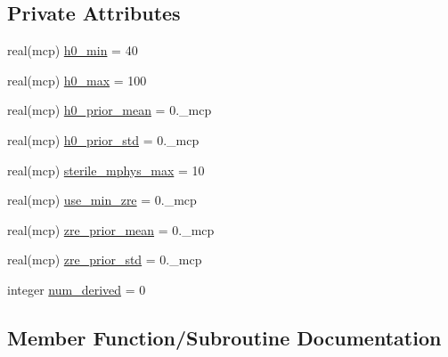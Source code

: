 \subsection*{Private Attributes}
\begin{DoxyCompactItemize}
\item 
real(mcp) \mbox{\hyperlink{structcosmologyparameterizations_1_1thetaparameterization_aa3f651b71c52408629955a217ab33512}{h0\+\_\+min}} = 40
\item 
real(mcp) \mbox{\hyperlink{structcosmologyparameterizations_1_1thetaparameterization_a00f2966bf10b5f62658a2d0084fd9fdb}{h0\+\_\+max}} = 100
\item 
real(mcp) \mbox{\hyperlink{structcosmologyparameterizations_1_1thetaparameterization_a55c99b8b92292fcb47c5fc6333f0b063}{h0\+\_\+prior\+\_\+mean}} = 0.\+\_\+mcp
\item 
real(mcp) \mbox{\hyperlink{structcosmologyparameterizations_1_1thetaparameterization_a45f7352ae34d1b09d3c95f9566863bc5}{h0\+\_\+prior\+\_\+std}} = 0.\+\_\+mcp
\item 
real(mcp) \mbox{\hyperlink{structcosmologyparameterizations_1_1thetaparameterization_a21d71021d5994befb2d4f429d1e2a593}{sterile\+\_\+mphys\+\_\+max}} = 10
\item 
real(mcp) \mbox{\hyperlink{structcosmologyparameterizations_1_1thetaparameterization_ad742c0f61df774363113b3ee7d608bf6}{use\+\_\+min\+\_\+zre}} = 0.\+\_\+mcp
\item 
real(mcp) \mbox{\hyperlink{structcosmologyparameterizations_1_1thetaparameterization_a3d40f8bc95ee04c997d841a4528eff4f}{zre\+\_\+prior\+\_\+mean}} = 0.\+\_\+mcp
\item 
real(mcp) \mbox{\hyperlink{structcosmologyparameterizations_1_1thetaparameterization_a343cc448111052117da28adc0b1f1466}{zre\+\_\+prior\+\_\+std}} = 0.\+\_\+mcp
\item 
integer \mbox{\hyperlink{structcosmologyparameterizations_1_1thetaparameterization_a7ccf5c008a734ea8dbbc8d5b50c44c2f}{num\+\_\+derived}} = 0
\end{DoxyCompactItemize}


\subsection{Member Function/\+Subroutine Documentation}
\mbox{\label{structcosmologyparameterizations_1_1thetaparameterization_ac299f73f174fd484e94676546103c66d}} 
